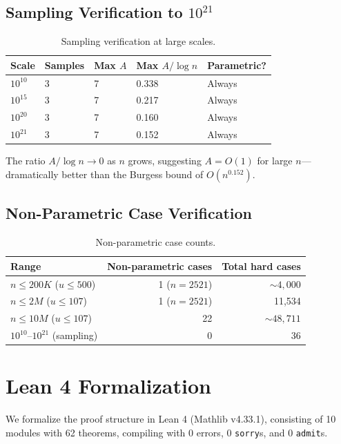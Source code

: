 \documentclass[11pt,a4paper]{article}
\theoremstyle{plain}
\theoremstyle{plain}
\theoremstyle{definition}
\numberwithin{equation}{section}
\begin{document}
\subsection{Sampling Verification to \texorpdfstring{$10^{21}$}{10²¹}}

\begin{table}[h]
\centering
\begin{tabular}{lllll}
\toprule
Scale & Samples & Max $A$ & Max $A/\log n$ & Parametric? \\
\midrule
$10^{10}$ & 3 & 7 & 0.338 & Always \\
$10^{15}$ & 3 & 7 & 0.217 & Always \\
$10^{20}$ & 3 & 7 & 0.160 & Always \\
$10^{21}$ & 3 & 7 & 0.152 & Always \\
\bottomrule
\end{tabular}
\caption{Sampling verification at large scales.}
\end{table}

The ratio $A/\log n \to 0$ as $n$ grows, suggesting $A = O(1)$ for large $n$---dramatically better than the Burgess bound of $O(n^{0.152})$.

\subsection{Non-Parametric Case Verification}

\begin{table}[h]
\centering
\begin{tabular}{lrr}
\toprule
Range & Non-parametric cases & Total hard cases \\
\midrule
$n \leq 200K$ ($u \leq 500$) & 1 ($n = 2521$) & $\sim 4{,}000$ \\
$n \leq 2M$ ($u \leq 107$) & 1 ($n = 2521$) & 11,534 \\
$n \leq 10M$ ($u \leq 107$) & 22 & $\sim 48{,}711$ \\
$10^{10}$--$10^{21}$ (sampling) & 0 & 36 \\
\bottomrule
\end{tabular}
\caption{Non-parametric case counts.}
\end{table}

\section{Lean 4 Formalization}

We formalize the proof structure in Lean 4 (Mathlib v4.33.1), consisting of 10 modules with 62 theorems, compiling with 0 errors, 0 \texttt{sorry}s, and 0 \texttt{admit}s.
\end{document}
